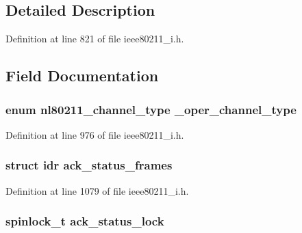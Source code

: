 \subsection{Detailed Description}


Definition at line 821 of file ieee80211\-\_\-i.\-h.



\subsection{Field Documentation}
\hypertarget{structieee80211__local_a89b1771fcea39258509a121d3282d993}{
\subsubsection[{\-\_\-oper\-\_\-channel\-\_\-type}]{\setlength{\rightskip}{0pt plus 5cm}enum nl80211\-\_\-channel\-\_\-type \-\_\-oper\-\_\-channel\-\_\-type}}\label{structieee80211__local_a89b1771fcea39258509a121d3282d993}


Definition at line 976 of file ieee80211\-\_\-i.\-h.

\hypertarget{structieee80211__local_a94ad6f2bba1c98eb6d70944990d275d1}{
\subsubsection[{ack\-\_\-status\-\_\-frames}]{\setlength{\rightskip}{0pt plus 5cm}struct idr ack\-\_\-status\-\_\-frames}}\label{structieee80211__local_a94ad6f2bba1c98eb6d70944990d275d1}


Definition at line 1079 of file ieee80211\-\_\-i.\-h.

\hypertarget{structieee80211__local_aaafe5cc995adaa9d3c6d1a5bb9117189}{
\subsubsection[{ack\-\_\-status\-\_\-lock}]{\setlength{\rightskip}{0pt plus 5cm}spinlock\-\_\-t ack\-\_\-status\-\_\-lock}}\label{structieee80211__local_aaafe5cc995adaa9d3c6d1a5bb9117189}


